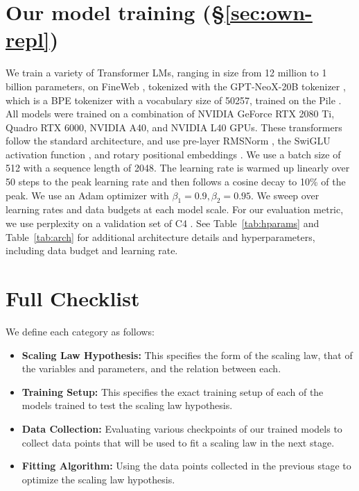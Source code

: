 

\section{Our model training (\S\ref{sec:own-repl})}\label{app:our_models}

We train a variety of Transformer LMs, ranging in size from 12 million to 1 billion parameters, on FineWeb \citep{penedo2024finewebdatasetsdecantingweb}, tokenized with the GPT-NeoX-20B tokenizer \citep{black2022gptneox20bopensourceautoregressivelanguage}, which is a BPE tokenizer with a vocabulary size of 50257, trained on the Pile \citep{gao2020pile800gbdatasetdiverse}. All models were trained on a combination of NVIDIA GeForce RTX 2080 Ti, Quadro RTX 6000, NVIDIA A40, and NVIDIA L40 GPUs. These transformers follow the standard architecture, and use pre-layer RMSNorm \citep{kudo2018sentencepiece}, the SwiGLU activation function \citep{shazeer2020gluvariantsimprovetransformer}, and rotary positional embeddings \citep{su2024roformer}. We use a batch size of 512 with a sequence length of 2048. The learning rate is warmed up linearly over 50 steps to the peak learning rate and then follows a cosine decay to 10\% of the peak. We use an Adam optimizer with $\beta_1 =
0.9, \beta_2 = 0.95$. We sweep over learning rates and data budgets at each model scale. For our evaluation metric, we use perplexity on a validation set of C4 \citep{raffel2020exploring}. See Table~\ref{tab:hparams} and Table~\ref{tab:arch} for additional architecture details and hyperparameters, including data budget and learning rate.




\section{Full Checklist} \label{sec:app_checklist}

We define each category as follows:


\begin{itemize}
    \item {
    \textbf{Scaling Law Hypothesis:} This specifies the form of the scaling law, that of the variables and parameters, and the relation between each.}
    \item {\textbf{Training Setup:} This specifies the exact training setup of each of the models trained to test the scaling law hypothesis.}
    \item {\textbf{Data Collection:} Evaluating various checkpoints of our trained models to collect data points that will be used to fit a scaling law in the next stage.}
    \item {\textbf{Fitting Algorithm:} Using the data points collected in the previous stage to optimize the scaling law hypothesis.}
\end{itemize}


